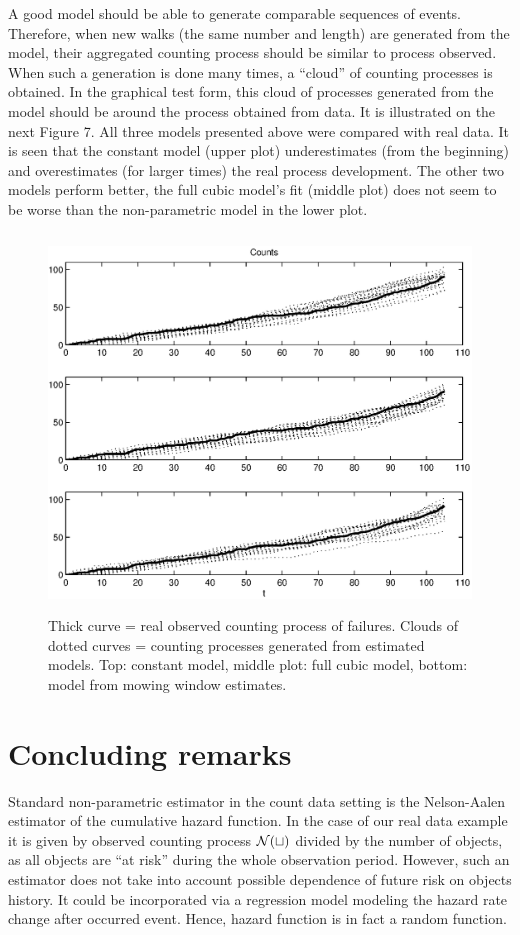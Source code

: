 \documentclass[11pt]{article}
\begin{document}
A good model should be able to generate comparable sequences of
events. Therefore, when new walks (the same number and length) are
generated from the model, their aggregated counting process should
be similar to process observed. When such a generation is done
many times, a ``cloud'' of counting processes is obtained. In the
graphical test form, this cloud of processes generated from the
model should be around the process obtained from data. It is
illustrated on the next Figure 7. All three models presented above
were compared with real data. It is seen that the constant model
(upper plot) underestimates (from the beginning) and overestimates
(for larger times) the real process development. The other two
models perform better, the full cubic model's fit (middle plot) does
not seem to be worse than the non-parametric model in the lower
plot.

\begin{figure}[h]
\centering
    \includegraphics[width = 12cm,height=10cm]{comp_fit.eps}
\caption{Thick curve = real observed counting process of failures.
Clouds of dotted curves = counting processes generated from
estimated models. Top: constant model, middle plot: full cubic
model, bottom: model from mowing window estimates.}
\end{figure}

\section{Concluding remarks}

Standard non-parametric estimator in the count data setting is the
Nelson-Aalen estimator of the cumulative hazard function. In the
case of our real data example it is given by observed counting
process $\cal{N}(t)$ divided by the number of objects, as all objects
are ``at risk'' during the whole observation period. However, such
an estimator does not take into account possible dependence of
future risk on objects history. It could be incorporated via a
regression model modeling the hazard rate change after occurred
event. Hence, hazard function is in fact a random function.
\end{document}
